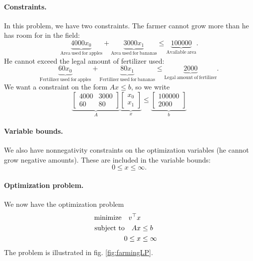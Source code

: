 \paragraph{Constraints.} In this problem, we have two constraints. The farmer cannot grow more than he has room for in the field:
\[
\underbrace{4000 x_0}_\mathrm{Area\ used\ for\ apples} + \underbrace{3000 x_1}_\mathrm{Area\ used\ for\ bananas} \leq \underbrace{100000}_\mathrm{Available\ area}.
\]
He cannot exceed the legal amount of fertilizer used:
\[
\underbrace{60 x_0}_\mathrm{Fertilizer\ used\ for\ apples} + \underbrace{80 x_1}_\mathrm{Fertilizer\ used\ for\ bananas} \leq \underbrace{2000}_\mathrm{Legal\ amount\ of\ fertilizer}.
\]
We want a constraint on the form $Ax \leq b$, so we write
\[
\underbrace{\begin{bmatrix} 4000 & 3000 \\ 60 & 80 \end{bmatrix}}_A \underbrace{\begin{bmatrix} x_0 \\ x_1 \end{bmatrix}}_x \leq \underbrace{\begin{bmatrix} 100000 \\ 2000 \end{bmatrix}}_b
\]

\paragraph{Variable bounds.}
We also have nonnegativity constraints on the optimization variables (he cannot grow negative amounts). These are included in the variable bounds:
\[
0 \leq x \leq \infty.
\]

\paragraph{Optimization problem.} We now have the optimization problem
\begin{subequations}
\begin{align}
\mathrm{minimize} \ \ \  v^\top x \\
\mathrm{subject\ to} \ \ \  Ax &\leq b \\
0 \leq x &\leq \infty
\end{align}
\end{subequations}
The problem is illustrated in fig. \ref{fig:farmingLP}.

